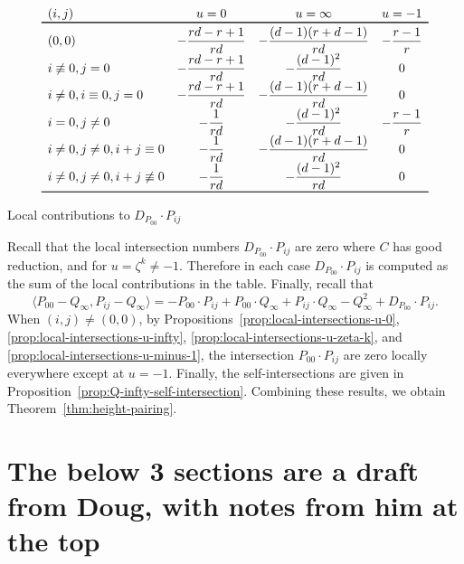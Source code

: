 \documentclass[reqno]{amsart}
\theoremstyle{definition}
\theoremstyle{remark}
\begin{document}
\renewcommand\arraystretch{2}
\begin{table}[htb]
  \centering
  \[
  \begin{array}[c]{lccc}
    (i,j) & u = 0 & u = \infty & u = -1 \\ \toprule
    (0,0) & -\dfrac{rd-r+1}{rd} & -\dfrac{(d-1)(r+d-1)}{rd} & -\dfrac{r-1}{r} \\
    i \not\equiv 0, j = 0 & -\dfrac{rd - r + 1}{rd} & -\dfrac{(d-1)^2}{rd} & 0 \\
    i \neq 0, i \equiv 0, j = 0 & -\dfrac{rd - r + 1}{rd} & -\dfrac{(d-1)(r+d-1)}{rd} & 0 \\
    i = 0, j \neq 0 & -\dfrac{1}{rd} & -\dfrac{(d-1)^2}{rd} & -\dfrac{r-1}{r} \\
    i \neq 0, j \neq 0, i + j \equiv 0 & -\dfrac{1}{rd} & -\dfrac{(d-1)(r+d-1)}{rd} & 0 \\
    i \neq 0, j \neq 0, i + j \not\equiv 0 & -\dfrac{1}{rd} & -\dfrac{(d-1)^2}{rd} & 0 \\
    \bottomrule
  \end{array}
  \]
  \caption{Local contributions to $D_{P_{00}} \cdot P_{ij}$}
  \label{tab:local-contrib-dp-dot-p}
\end{table}
\renewcommand\arraystretch{1}

Recall that the local intersection numbers $D_{P_{00}} \cdot P_{ij}$ are zero where $C$ has good reduction, and for $u = \zeta^k \neq -1$. Therefore in each case $D_{P_{00}} \cdot P_{ij}$ is computed as the sum of the local contributions in the table. Finally, recall that
\[
\langle {P_{00}} - Q_\infty, P_{ij} - Q_\infty\rangle = -{P_{00}} \cdot P_{ij} + {P_{00}} \cdot Q_\infty + P_{ij} \cdot Q_\infty - Q_\infty^2 + D_{P_{00}} \cdot P_{ij}.
\]
When $(i,j) \neq (0,0)$, by Propositions~\ref{prop:local-intersections-u-0}, \ref{prop:local-intersections-u-infty}, \ref{prop:local-intersections-u-zeta-k}, and \ref{prop:local-intersections-u-minus-1}, the intersection $P_{00} \cdot P_{ij}$ are zero locally everywhere except at $u = -1$. Finally, the self-intersections are given in Proposition~\ref{prop:Q-infty-self-intersection}. Combining these results, we obtain Theorem~\ref{thm:height-pairing}.





\section*{The below 3 sections are a draft from Doug, with notes from him at the top}
\end{document}
